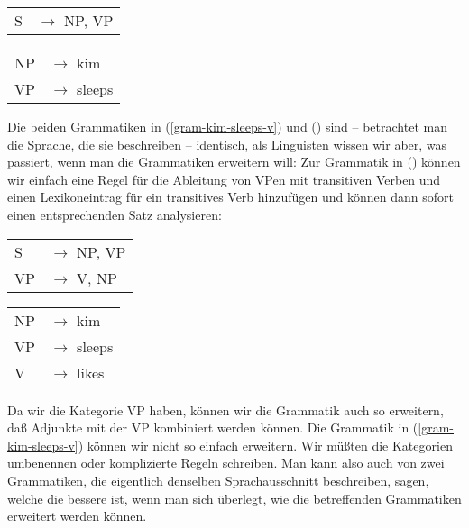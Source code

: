 \ea
\begin{tabular}[t]{@{}l@{ }l}       
{S}  & {$\to$ NP, VP}\\
\end{tabular}\hspace{2cm}%
\begin{tabular}[t]{@{}l@{ }l}
{NP} & {$\to$ kim}\\
{VP} & {$\to$ sleeps}\\
\end{tabular}
\z
Die beiden Grammatiken in (\ref{gram-kim-sleeps-v}) und () sind -- betrachtet man die Sprache, die sie beschreiben -- identisch,
als Linguisten wissen wir aber, was passiert, wenn man die Grammatiken erweitern will: Zur Grammatik
in () können wir einfach eine Regel für die Ableitung von VPen mit transitiven Verben und
einen Lexikoneintrag für ein transitives Verb hinzufügen und können dann sofort einen entsprechenden
Satz analysieren:
\ea
\begin{tabular}[t]{@{}l@{ }l}       
{S}  & {$\to$ NP, VP}\\
VP   & $\to$ V, NP\\
\end{tabular}\hspace{2cm}%
\begin{tabular}[t]{@{}l@{ }l}
{NP} & {$\to$ kim}\\
{VP} & {$\to$ sleeps}\\
V    & $\to$ likes\\
\end{tabular}
\z
Da wir die Kategorie VP haben, können wir die Grammatik auch so erweitern, daß Adjunkte
mit der VP kombiniert werden können. Die Grammatik in (\ref{gram-kim-sleeps-v}) können wir 
nicht so einfach erweitern. Wir müßten die Kategorien umbenennen oder komplizierte Regeln
schreiben. Man kann also auch von zwei Grammatiken, die eigentlich denselben Sprachausschnitt
beschreiben, sagen, welche die bessere ist, wenn man sich überlegt, wie die betreffenden
Grammatiken erweitert werden können.

